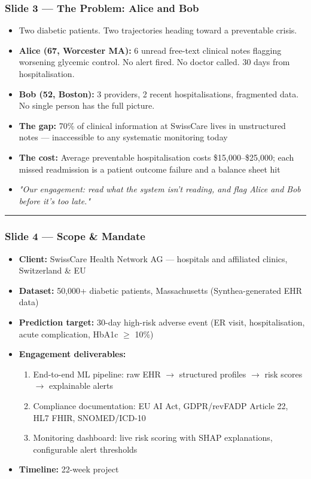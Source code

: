 \documentclass[11pt,a4paper]{article}
\begin{document}
\subsubsection{Slide 3 --- The Problem: Alice and Bob}
\begin{itemize}
\item Two diabetic patients. Two trajectories heading toward a preventable crisis.
\item \textbf{Alice (67, Worcester MA):} 6 unread free-text clinical notes flagging worsening glycemic control. No alert fired. No doctor called. 30 days from hospitalisation.
\item \textbf{Bob (52, Boston):} 3 providers, 2 recent hospitalisations, fragmented data. No single person has the full picture.
\item \textbf{The gap:} 70\% of clinical information at SwissCare lives in unstructured notes --- inaccessible to any systematic monitoring today
\item \textbf{The cost:} Average preventable hospitalisation costs \$15,000--\$25,000; each missed readmission is a patient outcome failure and a balance sheet hit
\item \emph{"Our engagement: read what the system isn't reading, and flag Alice and Bob before it's too late."}
\end{itemize}

\noindent\rule{\linewidth}{0.4pt}

\subsubsection{Slide 4 --- Scope \& Mandate}
\begin{itemize}
\item \textbf{Client:} SwissCare Health Network AG --- hospitals and affiliated clinics, Switzerland \& EU
\item \textbf{Dataset:} 50,000+ diabetic patients, Massachusetts (Synthea-generated EHR data)
\item \textbf{Prediction target:} 30-day high-risk adverse event (ER visit, hospitalisation, acute complication, HbA1c $\geq$ 10\%)
\item \textbf{Engagement deliverables:}
\begin{enumerate}
\item End-to-end ML pipeline: raw EHR $\rightarrow$ structured profiles $\rightarrow$ risk scores $\rightarrow$ explainable alerts
\item Compliance documentation: EU AI Act, GDPR/revFADP Article 22, HL7 FHIR, SNOMED/ICD-10
\item Monitoring dashboard: live risk scoring with SHAP explanations, configurable alert thresholds
\end{enumerate}
\item \textbf{Timeline:} 22-week project
\end{itemize}
\end{document}
